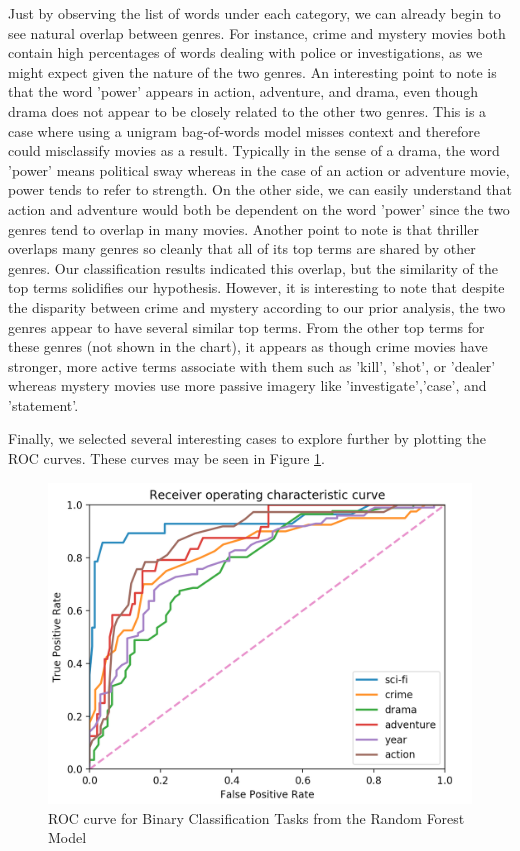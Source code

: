 \documentclass{article} %
\begin{document}
Just by observing the list of words under each category, we can already begin to see natural overlap between genres. For instance, crime and mystery movies both contain high percentages of words dealing with police or investigations, as we might expect given the nature of the two genres. An interesting point to note is that the word 'power' appears in action, adventure, and drama, even though drama does not appear to be closely related to the other two genres. This is a case where using a unigram bag-of-words model misses context and therefore could misclassify movies as a result. Typically in the sense of a drama, the word 'power' means political sway whereas in the case of an action or adventure movie, power tends to refer to strength. On the other side, we can easily understand that action and adventure would both be dependent on the word 'power' since the two genres tend to overlap in many movies. Another point to note is that thriller overlaps many genres so cleanly that all of its top terms are shared by other genres. Our classification results indicated this overlap, but the similarity of the top terms solidifies our hypothesis. However, it is interesting to note that despite the disparity between crime and mystery according to our prior analysis, the two genres appear to have several similar top terms. From the other top terms for these genres (not shown in the chart), it appears as though crime movies have stronger, more active terms associate with them such as 'kill', 'shot', or 'dealer' whereas mystery movies use more passive imagery like 'investigate','case', and 'statement'.

Finally, we selected several interesting cases to explore further by plotting the ROC curves. These curves may be seen in Figure \ref{roc_data}.

\begin{figure}[htb]
\centering
\includegraphics[width=0.8\linewidth]{roc}
\caption{ROC curve for Binary Classification Tasks from the Random Forest Model}
\label{roc_data}
\end{figure}
\end{document}
